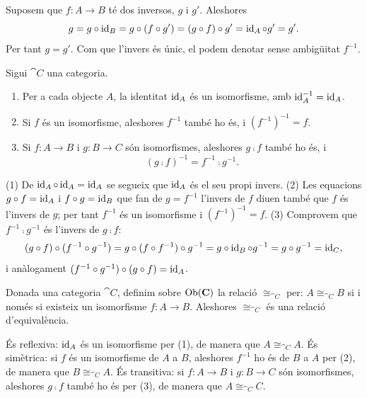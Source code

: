 \begin{prova}
Suposem que $f\colon A\to B$ té dos inversos, $g$ i $g'$. Aleshores
\[
g=g\circ\operatorname{id}_B=g\circ(f\circ g')=(g\circ f)\circ g'=\operatorname{id}_A\circ g'=g'.
\]
Per tant $g=g'$. Com que l'invers és únic, el podem denotar sense ambigüitat $f^{-1}$.
\end{prova}

\begin{proposicio}
Sigui $\cat{C}$ una categoria.
\begin{enumerate}
\item Per a cada objecte $A$, la identitat $\operatorname{id}_A$ és un isomorfisme, amb $\operatorname{id}_A^{-1}=\operatorname{id}_A$.
\item Si $f$ és un isomorfisme, aleshores $f^{-1}$ també ho és, i $(f^{-1})^{-1}=f$.
\item Si $f\colon A\to B$ i $g\colon B\to C$ són isomorfismes, aleshores $g\comp f$ també ho és, i
\[
(g\comp f)^{-1}=f^{-1}\comp g^{-1}.
\]
\end{enumerate}
\end{proposicio}

\begin{prova}
(1) De $\operatorname{id}_A\circ\operatorname{id}_A=\operatorname{id}_A$ se segueix que $\operatorname{id}_A$ és el seu propi invers. (2) Les equacions $g\circ f=\operatorname{id}_A$ i $f\circ g=\operatorname{id}_B$ que fan de $g=f^{-1}$ l'invers de $f$ diuen també que $f$ és l'invers de $g$; per tant $f^{-1}$ és un isomorfisme i $(f^{-1})^{-1}=f$. (3) Comprovem que $f^{-1}\comp g^{-1}$ és l'invers de $g\comp f$:
\[
(g\circ f)\circ(f^{-1}\circ g^{-1})=g\circ(f\circ f^{-1})\circ g^{-1}=g\circ\operatorname{id}_B\circ g^{-1}=g\circ g^{-1}=\operatorname{id}_C,
\]
i anàlogament $(f^{-1}\circ g^{-1})\circ(g\circ f)=\operatorname{id}_A$.
\end{prova}

\begin{corollari}
Donada una categoria $\cat{C}$, definim sobre $\operatorname{Ob}(\mathbf{C})$ la relació $\cong_{\cat{C}}$ per: $A\cong_{\cat{C}}B$ si i només si existeix un isomorfisme $f\colon A\to B$. Aleshores $\cong_{\cat{C}}$ és una relació d'equivalència.
\end{corollari}

\begin{prova}
És reflexiva: $\operatorname{id}_A$ és un isomorfisme per (1), de manera que $A\cong_{\cat{C}}A$. És simètrica: si $f$ és un isomorfisme de $A$ a $B$, aleshores $f^{-1}$ ho és de $B$ a $A$ per (2), de manera que $B\cong_{\cat{C}}A$. És transitiva: si $f\colon A\to B$ i $g\colon B\to C$ són isomorfismes, aleshores $g\comp f$ també ho és per (3), de manera que $A\cong_{\cat{C}}C$.
\end{prova}

